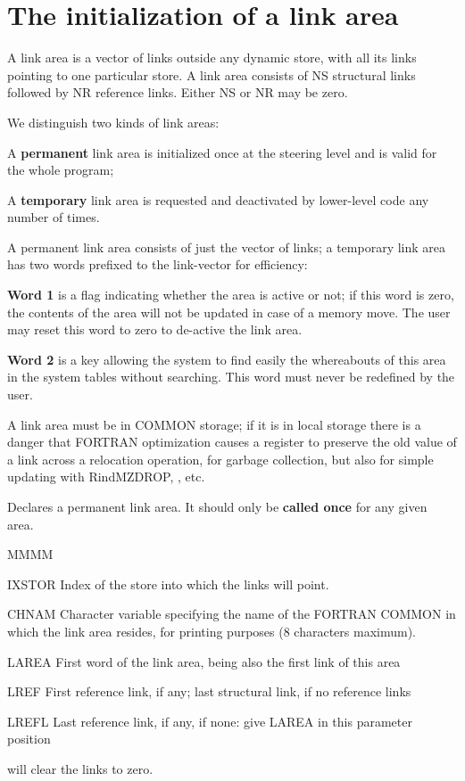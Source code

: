 \section{The initialization of a link area}
\par A link area is a vector of links outside any dynamic store, with
all its links pointing to one particular store. A link area
consists of NS structural links followed by NR reference links.
Either NS or NR may be zero.
\par We distinguish two kinds of link areas:
\begin{OL}
\item A {\bf permanent}
link area is initialized once at the steering level
and is valid for the whole program;
\item A {\bf temporary}
link area is requested and deactivated
by lower-level code any number of times.
\end{OL}
A permanent link area consists of just the vector of links;
a temporary link area has two words prefixed to the link-vector
for efficiency:
\begin{UL}
\item {\bf Word 1}
is a flag indicating whether the area is active or not;
if this word is zero, the contents of the area will
not be updated in case of a memory move.
The user may reset this word to zero to de-active the link area.
\item {\bf Word 2} is a key allowing the system to find easily the
whereabouts of this area in the system tables without searching.
This word must never be redefined by the user.
\end{UL}
A link area must be in COMMON storage;
if it is in local storage there is a danger that FORTRAN
optimization causes a register to preserve the old value of a link
across a relocation operation,
for garbage collection,
but also for simple updating with Rind{MZDROP}, , etc.
\par Declares a permanent link area. It should only be {\bf called
once} for any given area.
\Idesc
\begin{DL}{MMMM}
\item[IXSTOR]Index of the store into which the links will point.
\item[CHNAM]Character variable specifying the
name of the FORTRAN COMMON in which the link area resides,
for printing purposes (8 characters maximum).
\item[LAREA]First word of the link area,
being also the first link of this area
\item[LREF]First reference link, if any;
last structural link, if no reference links
\item[LREFL]Last reference link, if any,
if none: give LAREA in this parameter position
\end{DL}
\par {} will clear the links to zero.
